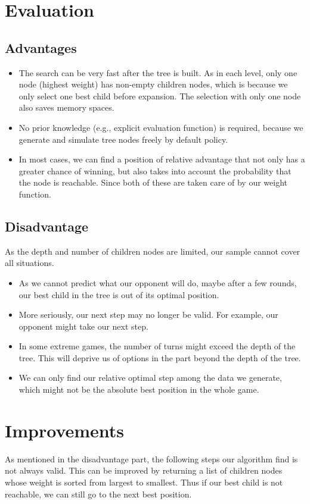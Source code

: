 \documentclass[twoside,11pt]{article}
\begin{document}
\section{Evaluation}
\subsection{Advantages}
\begin{itemize}
\item The search can be very fast after the tree is built. As in each level, only one node (highest weight) has non-empty children nodes, which is because we only select one best child before expansion. The selection with only one node also saves memory spaces.
\item No prior knowledge (e.g., explicit evaluation function) is required, because we generate and simulate tree nodes freely by default policy.
\item In most cases, we can find a position of relative advantage that not only has a greater chance of winning, but also takes into account the probability that the node is reachable. Since both of these are taken care of by our weight function.
\end{itemize}

\subsection{Disadvantage}
As the depth and number of children nodes are limited, our sample cannot cover all situations. 
\begin{itemize}
\item As we cannot predict what our opponent will do, maybe after a few rounds, our best child in the tree is out of its optimal position. 
\item More seriously, our next step may no longer be valid. For example, our opponent might take our next step.
\item In some extreme games, the number of turns might exceed the depth of the tree. This will deprive us of options in the part beyond the depth of the tree.
\item We can only find our relative optimal step among the data we generate, which might not be the absolute best position in the whole game.
\end{itemize}

\section{Improvements}
As mentioned in the disadvantage part, the following steps our algorithm find is not always valid. This can be improved by returning a list of children nodes whose weight is sorted from largest to smallest. Thus if our best child is not reachable, we can still go to the next best position.
\end{document}
